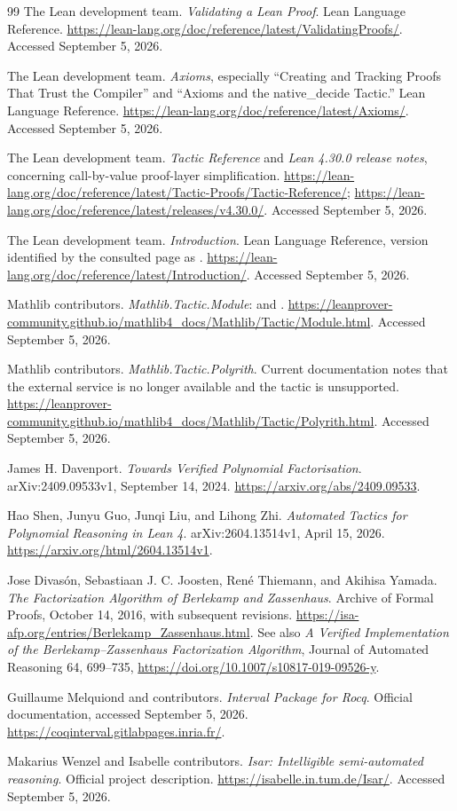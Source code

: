 \documentclass[11pt,a4paper]{article}
\newcommand{\code}[1]{\texttt{\detokenize{#1}}}
\theoremstyle{remark}
\begin{document}
\begin{thebibliography}{99}
The Lean development team. \emph{Validating a Lean Proof}. Lean Language Reference.
\url{https://lean-lang.org/doc/reference/latest/ValidatingProofs/}.
Accessed September 5, 2026.

The Lean development team. \emph{Axioms}, especially ``Creating and Tracking
Proofs That Trust the Compiler'' and ``Axioms and the native\_decide Tactic.''
Lean Language Reference.
\url{https://lean-lang.org/doc/reference/latest/Axioms/}.
Accessed September 5, 2026.

The Lean development team. \emph{Tactic Reference} and \emph{Lean 4.30.0 release
notes}, concerning call-by-value proof-layer simplification.
\url{https://lean-lang.org/doc/reference/latest/Tactic-Proofs/Tactic-Reference/};
\url{https://lean-lang.org/doc/reference/latest/releases/v4.30.0/}.
Accessed September 5, 2026.

The Lean development team. \emph{Introduction}. Lean Language Reference,
version identified by the consulted page as \code{4.34.0-rc2}.
\url{https://lean-lang.org/doc/reference/latest/Introduction/}.
Accessed September 5, 2026.

Mathlib contributors. \emph{Mathlib.Tactic.Module}: \code{match_scalars} and
\code{module}.
\url{https://leanprover-community.github.io/mathlib4_docs/Mathlib/Tactic/Module.html}.
Accessed September 5, 2026.

Mathlib contributors. \emph{Mathlib.Tactic.Polyrith}. Current documentation notes
that the external service is no longer available and the tactic is unsupported.
\url{https://leanprover-community.github.io/mathlib4_docs/Mathlib/Tactic/Polyrith.html}.
Accessed September 5, 2026.

James H. Davenport. \emph{Towards Verified Polynomial Factorisation}.
arXiv:2409.09533v1, September 14, 2024.
\url{https://arxiv.org/abs/2409.09533}.

Hao Shen, Junyu Guo, Junqi Liu, and Lihong Zhi.
\emph{Automated Tactics for Polynomial Reasoning in Lean 4}.
arXiv:2604.13514v1, April 15, 2026.
\url{https://arxiv.org/html/2604.13514v1}.

Jose Divas\'on, Sebastiaan J. C. Joosten, Ren\'e Thiemann, and Akihisa Yamada.
\emph{The Factorization Algorithm of Berlekamp and Zassenhaus}.
Archive of Formal Proofs, October 14, 2016, with subsequent revisions.
\url{https://isa-afp.org/entries/Berlekamp_Zassenhaus.html}.
See also \emph{A Verified Implementation of the Berlekamp--Zassenhaus
Factorization Algorithm}, Journal of Automated Reasoning 64, 699--735,
\url{https://doi.org/10.1007/s10817-019-09526-y}.

Guillaume Melquiond and contributors. \emph{Interval Package for Rocq}.
Official documentation, accessed September 5, 2026.
\url{https://coqinterval.gitlabpages.inria.fr/}.

Makarius Wenzel and Isabelle contributors. \emph{Isar: Intelligible
semi-automated reasoning}. Official project description.
\url{https://isabelle.in.tum.de/Isar/}.
Accessed September 5, 2026.
\end{thebibliography}
\end{document}
